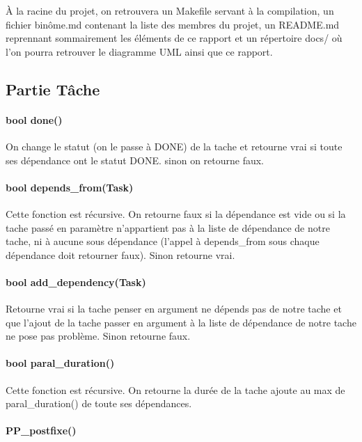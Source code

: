 \documentclass[paper=a4, fontsize=11pt, frenchb, englishb]{article}
\begin{document}
À la racine du projet, on retrouvera un Makefile servant à la compilation, un fichier binôme.md contenant la liste des membres du projet, un README.md reprennant sommairement les éléments de ce rapport et un répertoire docs/ où l'on pourra retrouver le diagramme UML ainsi que ce rapport.
		
		\subsection{Partie Tâche}
		
			\paragraph{bool done()}
			
On change le statut (on le passe à DONE) de la tache et retourne vrai si toute ses dépendance ont le statut DONE. sinon on retourne faux.
			
			\paragraph{bool depends\_from(Task)}
Cette fonction est récursive. On retourne faux si la dépendance est vide ou si la tache passé en paramètre n'appartient pas à la liste de dépendance de notre tache, ni à aucune sous dépendance (l'appel à depends\_from sous chaque dépendance doit retourner faux). Sinon retourne vrai.

			\paragraph{bool add\_dependency(Task)}
			
Retourne vrai si la tache penser en argument ne dépends pas de notre tache et que l'ajout de la tache passer en argument à la liste de dépendance de notre tache ne pose pas problème. Sinon retourne faux.
			
			\paragraph{bool paral\_duration()}
			
Cette fonction est récursive. On retourne la durée de la tache ajoute au max de paral\_duration() de toute ses dépendances.

			\paragraph{PP\_postfixe()}
			
\end{document}
